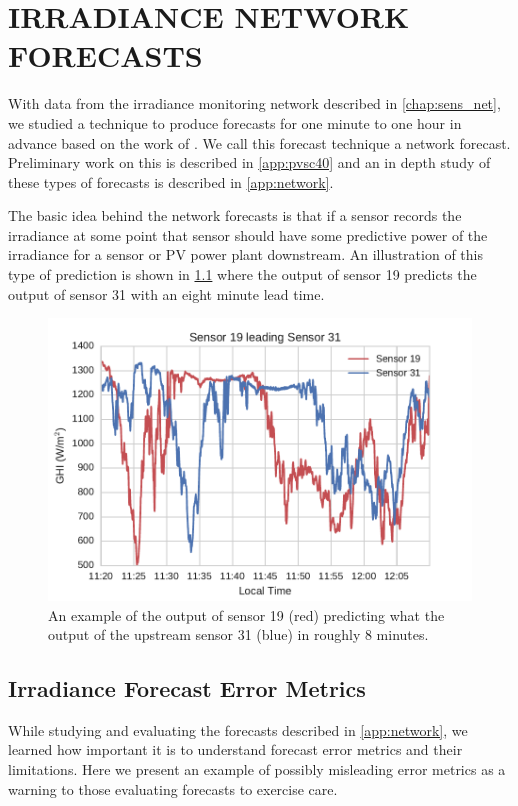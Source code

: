 \chapter{IRRADIANCE NETWORK FORECASTS}
\label{chap:network}

With data from the irradiance monitoring network described in
\cref{chap:sens_net}, we studied a technique to produce forecasts for
one minute to one hour in advance based on the work of
\cite{Lonij2013}.
We call this forecast technique a network forecast.
Preliminary work on this is described in \cref{app:pvsc40} and an in
depth study of these types of forecasts is described in
\cref{app:network}.

The basic idea behind the network forecasts is that if a sensor
records the irradiance at some point that sensor should have some
predictive power of the irradiance for a sensor or PV power plant
downstream.
An illustration of this type of prediction is shown in
\cref{fig:leading_sens} where the output of sensor 19 predicts the
output of sensor 31 with an eight minute lead time.

\begin{figure}[bht]
\centering
\includegraphics[width=.8\textwidth]{figs/leading_sens.pdf}
\caption[Example of data from one sensor predicting the output of
another]{An example of the output of sensor 19 (red) predicting what
  the output of the upstream sensor 31 (blue) in roughly 8
  minutes.}
\label{fig:leading_sens}
\end{figure}

\section{Irradiance Forecast Error Metrics}
\label{sec:error_metrics}

While studying and evaluating the forecasts described in
\cref{app:network}, we learned how important it is to understand
forecast error metrics and their limitations.
Here we present an example of possibly misleading error metrics as a
warning to those evaluating forecasts to exercise care.

